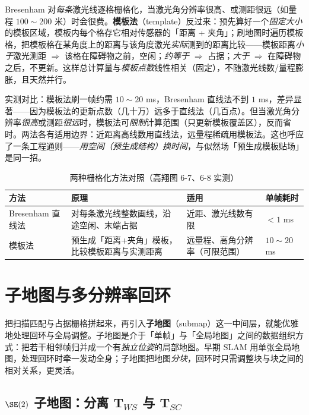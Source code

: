 Bresenham 对\emph{每条}激光线逐格栅格化，当激光角分辨率很高、或测距很远（如量程 $100\!\sim\!200$ 米）时会很费。\textbf{模板法}（template）反过来：预先算好一个\emph{固定大小}的模板区域，模板内每个格存它相对传感器的「距离 + 夹角」；刷地图时遍历模板格，把模板格在某角度上的距离与该角度激光\emph{实际}测到的距离比较——模板距离\emph{小于}激光测距 $\Rightarrow$ 该格在障碍物之前，空闲；\emph{约等于} $\Rightarrow$ 占据；\emph{大于} $\Rightarrow$ 在障碍物之后，不更新。这样总计算量与\emph{模板点数}线性相关（固定），不随激光线数/量程膨胀，且天然并行。

实测对比：模板法刷一帧约需 $10\!\sim\!20$ ms，Bresenham 直线法不到 $1$ ms，差异显著——因为模板法的更新点数（几十万）远多于直线法（几百点）。但当激光角分辨率\emph{很高}或测距\emph{很远}时，模板法可\emph{限制}计算范围（只更新模板覆盖区），反而省时。两法各有适用边界：近距离高线数用直线法，远量程稀疏用模板法。这也呼应了一条工程通则——\emph{用空间（预生成结构）换时间}，与似然场「预生成模板贴场」是同一招。

\begin{table}[H]\centering\small
\caption{两种栅格化方法对照（高翔图 6-7、6-8 实测）}
\label{tab:slam2d-raster}
\begin{tabular}{p{} p{} p{} p{}}
\toprule
方法 & 原理 & 适用 & 单帧耗时 \\
\midrule
Bresenham 直线法 & 对每条激光线整数画线，沿途空闲、末端占据 & 近距、激光线数有限 & $<1$ ms \\
模板法 & 预生成「距离+夹角」模板，比较模板距离与实测距离 & 远量程、高角分辨率（可限范围） & $10\!\sim\!20$ ms \\
\bottomrule
\end{tabular}
\end{table}

\section{子地图与多分辨率回环}
\label{sec:slam2d-submap}

把扫描匹配与占据栅格拼起来，再引入\textbf{子地图}（submap）这一中间层，就能优雅地处理回环与全局调整。子地图是介于「单帧」与「全局地图」之间的数据组织方式：把若干相邻帧归并成一个有\emph{独立位姿}的局部地图。早期 SLAM 用单张全局地图，处理回环时牵一发动全身；子地图把地图\emph{分块}，回环时只需调整块与块之间的相对关系，更灵活。

\subsection{\texorpdfstring{$\SE(2)$}{SE(2)} 子地图：分离 \texorpdfstring{$\mathbf{T}_{WS}$}{T\_WS} 与 \texorpdfstring{$\mathbf{T}_{SC}$}{T\_SC}}
\label{sec:slam2d-submap-se2}

